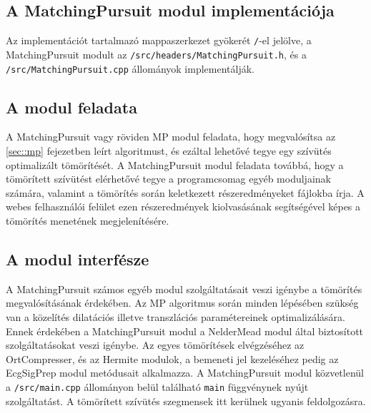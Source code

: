 \documentclass[oneside,titlepage,12pt,a4paper]{report}
\begin{document}

\subsection{A MatchingPursuit modul implementációja} \label{subsec::mpimpl}

Az implementációt tartalmazó mappaszerkezet gyökerét \texttt{/}-el jelölve, a MatchingPursuit modult  az \texttt{/src/headers/MatchingPursuit.h}, és a \texttt{/src/MatchingPursuit.cpp} állományok implementálják.

\subsection*{A modul feladata}

\par A MatchingPursuit vagy röviden MP modul feladata, hogy megvalósítsa az \ref{sec::mp} fejezetben leírt algoritmust, és ezáltal lehetővé tegye egy szívütés optimalizált tömörítését. A MatchingPursuit modul feladata továbbá, hogy a tömörített szívütést elérhetővé tegye a programcsomag egyéb moduljainak számára, valamint a tömörítés során keletkezett részeredményeket fájlokba írja. A webes felhasználói felület ezen részeredmények kiolvasásának segítségével képes a tömörítés menetének megjelenítésére. 

\subsection*{A modul interfésze}

\par A MatchingPursuit számos egyéb modul szolgáltatásait veszi igénybe a tömörítés megvalósításának érdekében. Az MP algoritmus során minden lépésében szükség van a közelítés dilatációs illetve transzlációs paramétereinek optimalizálására. Ennek érdekében a MatchingPursuit modul a NelderMead modul által biztosított szolgáltatásokat veszi igénybe. Az egyes tömörítések elvégzéséhez az OrtCompresser, és az Hermite modulok, a bemeneti jel kezeléséhez pedig az EcgSigPrep modul metódusait alkalmazza. A MatchingPursuit modul közvetlenül a \texttt{/src/main.cpp} állományon belül található \texttt{main} függvénynek nyújt szolgáltatást. A tömörített szívütés szegmensek itt kerülnek ugyanis feldolgozásra. 
\end{document}
